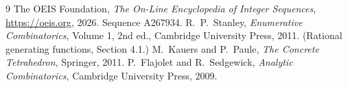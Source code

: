 \documentclass[11pt,a4paper]{article}
\theoremstyle{plain}
\theoremstyle{definition}
\begin{document}
\begin{thebibliography}{9}
 The OEIS Foundation, \emph{The On-Line Encyclopedia of Integer
Sequences}, \url{https://oeis.org}, 2026. Sequence A267934.
 R.~P.~Stanley, \emph{Enumerative Combinatorics}, Volume 1, 2nd ed.,
Cambridge University Press, 2011. (Rational generating functions, Section 4.1.)
 M.~Kauers and P.~Paule, \emph{The Concrete Tetrahedron}, Springer, 2011.
 P.~Flajolet and R.~Sedgewick, \emph{Analytic Combinatorics}, Cambridge
University Press, 2009.
\end{thebibliography}
\end{document}
